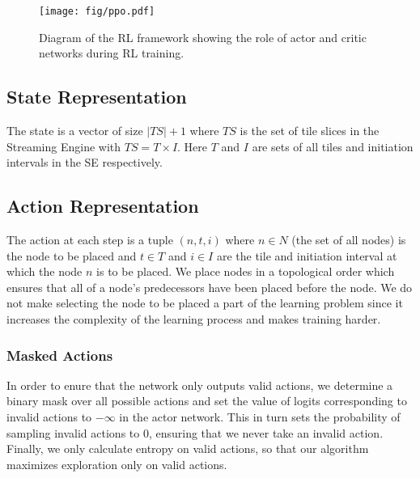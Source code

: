 \begin{figure}[h]
  \centering
  \texttt{[image: fig/ppo.pdf]}
  \caption{Diagram of the RL framework showing the role of actor and critic networks during RL training. }
  \label{fig:ppo}
\end{figure}

\subsection{State Representation}
The state is a vector of size $|TS|+1$ where $TS$ is the set of tile slices in the Streaming Engine with $TS=T \times I$. Here $T$ and $I$ are sets of all tiles and initiation intervals in the SE respectively.

\subsection{Action Representation}
The action at each step is a tuple \((n,t,i)\) where $n \in N$ (the set of all nodes) is the node to be placed and $t \in T$ and $i \in I$ are the tile and initiation interval at which the node $n$ is to be placed. 
We place nodes in a topological order which ensures that all of a node's predecessors have been placed before the node. 
We do not make selecting the node to be placed a part of the learning problem since it increases the complexity of the learning process and makes training harder.

\subsubsection{Masked Actions}
In order to enure that the network only outputs valid actions, we determine a binary mask over all possible actions and set the value of logits corresponding to invalid actions to $-\infty$ in the actor network. 
This in turn sets the probability of sampling invalid actions to $0$, ensuring that we never take an invalid action.
Finally, we only calculate entropy on valid actions, so that our algorithm maximizes exploration only on valid actions.

